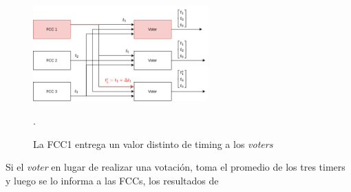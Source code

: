 \begin{figure}[H]
    \centering
    \includegraphics[width=0.6\textwidth]{img/3_4_2_consenso_3.png}
    \caption{La FCC1 entrega un valor distinto de timing a los \textit{voters}}.
    \label{fig:3_4_2_consenso_3}
\end{figure}

Si el \textit{voter} en lugar de realizar una votación, toma el promedio de los tres timers y luego se lo informa a las FCCs, los resultados de 